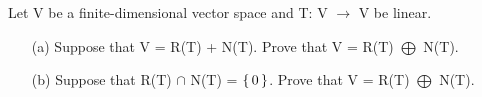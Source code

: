 Let V be a finite-dimensional vector space and T: V $\rightarrow$ V be linear.

\begin{enumerate}
	\item[(a)] Suppose that V = R(T) + N(T). Prove that V = R(T) $\bigoplus$ N(T).
	\item[(b)] Suppose that R(T) $\cap$ N(T) = $\left\{ \,0 \,\right\}$. Prove that V = R(T) $\bigoplus$ N(T).
\end{enumerate}
\begin{tcolorbox}
\begin{solution}
	
\end{solution}

\end{tcolorbox}